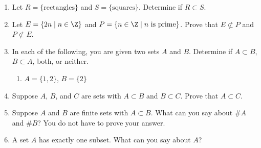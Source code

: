\probsec{~\ref{sec:subsets}}
\begin{enumerate}
  \item Let $R = \{\text{rectangles}\}$ and $S = \{\text{squares}\}$. Determine if $R \subset S$.

  \item Let $E = \{2n \mid n \in \Z\}$ and $P = \{n \in \Z \mid n \text{ is prime}\}$. Prove that $E \not\subset P$ and $P \not\subset E$.

  \item In each of the following, you are given two sets $A$ and $B$. Determine if $A \subset B$, $B \subset A$, both, or neither.
\begin{enumerate}
    \item $A = \{1, 2\}$, $B = \{2\}$
\end{enumerate}


  \item Suppose $A$, $B$, and $C$ are sets with $A \subset B$ and $B \subset C$. Prove that $A \subset C$.

  \item Suppose $A$ and $B$ are finite sets with $A \subset B$. What can you say about $\# A$ and $\# B$? You do not have to prove your answer.

  \item A set $A$ has exactly one subset. What can you say about $A$?
\end{enumerate}

